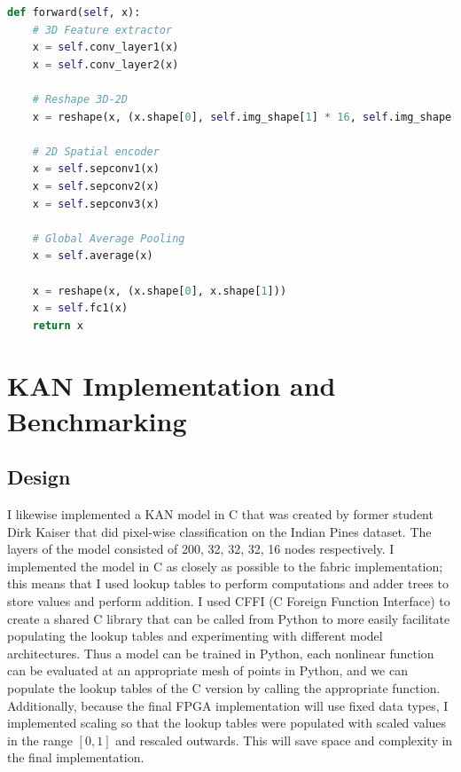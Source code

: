\documentclass[psamsfonts]{amsart}
\theoremstyle{definition}
\theoremstyle{remark}
\numberwithin{equation}{section}
\begin{document}
\begin{lstlisting}[language=python]
def forward(self, x):
    # 3D Feature extractor
    x = self.conv_layer1(x)
    x = self.conv_layer2(x)

    # Reshape 3D-2D
    x = reshape(x, (x.shape[0], self.img_shape[1] * 16, self.img_shape[2], self.img_shape[3]))

    # 2D Spatial encoder
    x = self.sepconv1(x)
    x = self.sepconv2(x)
    x = self.sepconv3(x)

    # Global Average Pooling
    x = self.average(x)

    x = reshape(x, (x.shape[0], x.shape[1]))
    x = self.fc1(x)
    return x

\end{lstlisting}

\section{KAN Implementation and Benchmarking}
\subsection{Design}
I likewise implemented a KAN model in C that was created by former student Dirk Kaiser that did pixel-wise classification on the Indian Pines dataset. The layers of the model consisted of 200, 32, 32, 32, 16 nodes respectively. I implemented the model in C as closely as possible to the fabric implementation; this means that I used lookup tables to perform computations and adder trees to store values and perform addition. I used CFFI (C Foreign Function Interface) to create a shared C library that can be called from Python to more easily facilitate populating the lookup tables and experimenting with different model architectures. Thus a model can be trained in Python, each nonlinear function can be evaluated at an appropriate mesh of points in Python, and we can populate the lookup tables of the C version by calling the appropriate function. Additionally, because the final FPGA implementation will use fixed data types, I implemented scaling so that the lookup tables were populated with scaled values in the range $[0,1]$ and rescaled outwards. This will save space and complexity in the final implementation.
\end{document}

